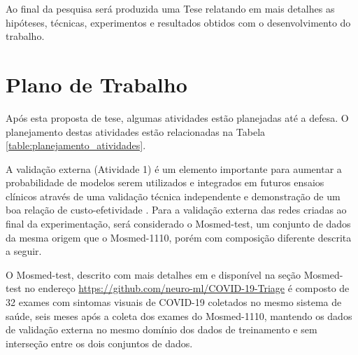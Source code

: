 Ao final da pesquisa será produzida uma Tese relatando em mais detalhes as hipóteses, técnicas, experimentos e resultados obtidos com o desenvolvimento do trabalho.

\section{Plano de Trabalho}\label{sec:cap_planejamento_plano}

Após esta proposta de tese, algumas atividades estão planejadas até a defesa. O planejamento destas atividades estão relacionadas na Tabela \ref{table:planejamento_atividades}.





A validação externa (Atividade 1) é um elemento importante para aumentar a probabilidade de modelos serem utilizados e integrados em futuros ensaios clínicos através de uma validação técnica independente e demonstração de um boa relação de custo-efetividade \cite{roberts2021common}. Para a validação externa das redes criadas ao final da experimentação, será considerado o Mosmed-test, um conjunto de dados da mesma origem que o Mosmed-1110, porém com composição diferente descrita a seguir. 

O Mosmed-test, descrito com mais detalhes em \cite{goncharov2021ct} e disponível na seção Mosmed-test no endereço \href{https://github.com/neuro-ml/COVID-19-Triage}{https://github.com/neuro-ml/COVID-19-Triage} é composto de  32 exames com sintomas visuais de COVID-19 coletados no mesmo sistema de saúde, seis meses após a coleta dos exames do Mosmed-1110, mantendo os dados de validação externa no mesmo domínio dos dados de treinamento e sem interseção entre os dois conjuntos de dados. 

